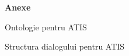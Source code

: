 \vspace{1.5cm} 
\textbf{\Huge Anexe}\\ 
\vspace{1.5cm}

 \setcounter{page}{1}

\large{Ontologie pentru ATIS}


\newpage
\large{Structura dialogului pentru ATIS}
